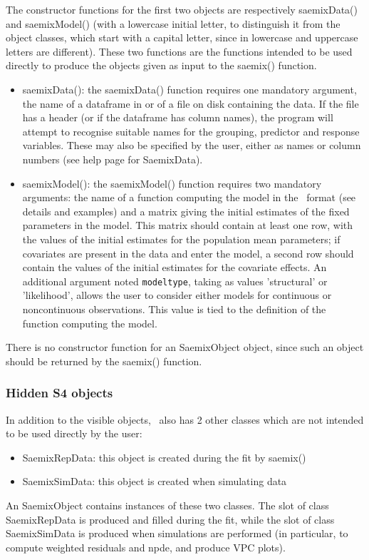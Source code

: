 The constructor functions for the first two objects are respectively {\sf saemixData()} and {\sf saemixModel()} (with a lowercase initial letter, to distinguish it from the object classes, which start with a capital letter, since in \R lowercase and uppercase letters are different). These two functions are the functions intended to be used directly to produce the objects given as input to the {\sf saemix()} function.
\begin{itemize}
\item {\sf saemixData()}: the {\sf saemixData()} function requires one mandatory argument, the name of a dataframe in \R or of a file on disk containing the data. If the file has a header (or if the dataframe has column names), the program will attempt to recognise suitable names for the grouping, predictor and response variables. These may also be specified by the user, either as names or column numbers (see help page for {\sf SaemixData}).
\item {\sf saemixModel()}: the {\sf saemixModel()} function requires two mandatory arguments: the name of a \R function computing the model in the \saemix~format (see details and examples) and a matrix giving the initial estimates of the fixed parameters in the model. This matrix should contain at least one row, with the values of the initial estimates for the population mean parameters; if covariates are present in the data and enter the model, a second row should contain  the values of the initial estimates for the covariate effects.
An additional argument noted \texttt{modeltype}, taking as values 'structural' or 'likelihood', allows the user to consider either models for continuous or noncontinuous observations. This value is tied to the definition of the \R function computing the model.
\end{itemize}
There is no constructor function for an {\sf SaemixObject} object, since such an object should be returned by the {\sf saemix()} function.

\subsubsection{Hidden S4 objects}

In addition to the visible objects, \saemix~also has 2 other classes which are not intended to be used directly by the user:
\begin{itemize}
\item {\sf SaemixRepData}: this object is created during the fit by {\sf saemix()}
\item {\sf SaemixSimData}: this object is created when simulating data
\end{itemize}
An {\sf SaemixObject} contains instances of these two classes. The slot of class {\sf SaemixRepData} is produced and filled during the fit, while the slot of class {\sf SaemixSimData} is produced when simulations are performed (in particular, to compute weighted residuals and npde, and produce VPC plots).

